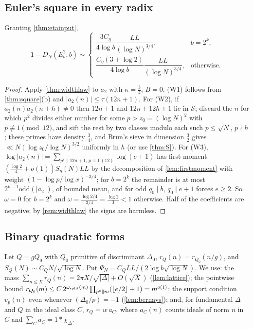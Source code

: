 \documentclass[11pt]{article}
\begin{document}
\subsection{Euler's square in every radix}\label{subsec:squareradix}

\begin{theorem}\label{thm:squareradix}
Granting \cref{thm:etainput},
\[
1-D_N(E_b^2;b)\sim\begin{cases}\dfrac{3C_\eta}{4\log b}\dfrac{LL}{(\log N)^{3/4}},&b=2^k,\\[2ex]
\dfrac{C_\eta(3+\log2)}{4\log b}\dfrac{LL}{(\log N)^{3/4}},&\text{otherwise.}\end{cases}
\]
\end{theorem}

\begin{proof}
Apply \cref{thm:widthlaw} to $a_2$ with $\kappa=\frac34$, $B=0$. (W1) follows from
\cref{thm:square}(b) and $|a_2(n)|\le\tau(12n+1)$. For (W2), if $a_2(n)a_2(n+h)\ne0$ then
$12n+1$ and $12n+12h+1$ lie in $\mathcal S$; discard the $n$ for which $p^2$ divides either
number for some $p>z_0=(\log N)^2$ with $p\not\equiv1\pmod{12}$, and sift the rest by two
classes modulo each such $p\le\sqrt N$, $p\nmid h$; these primes have density $\frac34$, and
Brun's sieve in dimension $\frac32$ gives $\ll N(\log z_0/\log N)^{3/2}$ uniformly in $h$ (or
use \cref{thm:S}). For (W3), $\log|a_2(n)|=\sum_{p^e\|12n+1,\,p\equiv1\,(12)}\log(e+1)$ has first
moment $(\frac{\log2}4+o(1))S_\eta(N)LL$ by the decomposition of \cref{lem:firstmoment} with
weight $(1-\log p/\log x)^{-3/4}$; for $b=2^k$ the remainder is at most
$2^{k-1}\mathrm{odd}(|a_2|)$, of bounded mean, and for odd $q_0\mid b$, $q_0\mid e+1$ forces
$e\ge2$. So $\omega=0$ for $b=2^k$ and $\omega=\frac{\log2/4}{3/4}=\frac{\log2}3<1$ otherwise.
Half of the coefficients are negative; by \cref{rem:widthlaw} the signs are harmless.
\end{proof}

\subsection{Binary quadratic forms}\label{subsec:forms}

Let $Q=gQ_0$ with $Q_0$ primitive of discriminant $\Delta_0$, $r_Q(n)=r_{Q_0}(n/g)$, and
$S_Q(N)\sim C_QN/\sqrt{\log N}$. Put $\Psi_N=C_QLL/(2\log b\sqrt{\log N})$. We use: the mass
$\sum_{n\le X}r_Q(n)=2\pi X/\sqrt{|\Delta|}+O(\sqrt X)$ (\cref{lem:lattice}); the pointwise bound
$r_{Q_0}(m)\le C\,2^{\omega_{\rm split}(m)}\prod_{p^e\|m}(\lfloor e/2\rfloor+1)=m^{o(1)}$; the
support condition $v_p(n)$ even whenever $(\Delta_0/p)=-1$ (\cref{lem:bernays}); and, for
fundamental $\Delta$ and $Q$ in the ideal class $C$, $r_Q=w\,a_C$, where $a_C(n)$ counts ideals
of norm $n$ in $C$ and $\sum_Ca_C=1*\chi_\Delta$.
\end{document}
